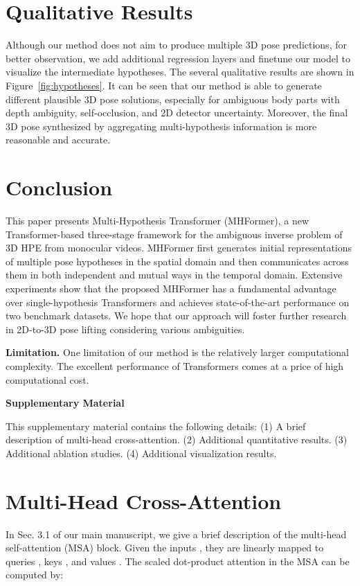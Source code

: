 \documentclass[10pt,twocolumn,letterpaper]{article}
\begin{document}
\section{Qualitative Results}
Although our method does not aim to produce multiple 3D pose predictions, for better observation, we add additional regression layers and finetune our model to visualize the intermediate hypotheses.
The several qualitative results are shown in Figure~\ref{fig:hypotheses}. 
It can be seen that our method is able to generate different plausible 3D pose solutions, especially for ambiguous body parts with depth ambiguity, self-occlusion, and 2D detector uncertainty. 
Moreover, the final 3D pose synthesized by aggregating multi-hypothesis information is more reasonable and accurate. 

\section{Conclusion}
This paper presents Multi-Hypothesis Transformer (MHFormer), a new Transformer-based three-stage framework for the ambiguous inverse problem of 3D HPE from monocular videos. 
MHFormer first generates initial representations of multiple pose hypotheses in the spatial domain and then communicates across them in both independent and mutual ways in the temporal domain. 
Extensive experiments show that the proposed MHFormer has a fundamental advantage over single-hypothesis Transformers and achieves state-of-the-art performance on two benchmark datasets. 
We hope that our approach will foster further research in 2D-to-3D pose lifting considering various ambiguities. 

\noindent \textbf{Limitation.}
One limitation of our method is the relatively larger computational complexity.
The excellent performance of Transformers comes at a price of high computational cost. 

{\small


}

\newpage
\appendix
{\noindent\Large\textbf{Supplementary Material}}
\newline

This supplementary material contains the following details:
(1) A brief description of multi-head cross-attention. 
(2) Additional quantitative results. 
(3) Additional ablation studies.  
(4) Additional visualization results. 

\section{Multi-Head Cross-Attention}
In Sec. 3.1 of our main manuscript, we give a brief description of the multi-head self-attention (MSA) block. 
Given the inputs , they are linearly mapped to queries , keys , and values . 
The scaled dot-product attention in the MSA can be computed by:
\end{document}
